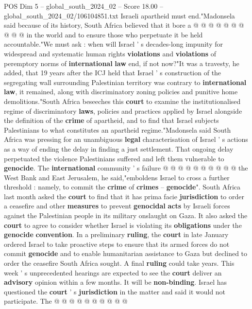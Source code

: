 \begin{textsample}{POS Dim 5 – global\_south\_2024\_02 – Score 18.00 – global\_south\_2024\_02/106104851.txt}
Israeli apartheid must end."Madonsela said because of its history, South Africa believed that it bore a @ @ @ @ @ @ @ @ @ @ in the world and to ensure those who perpetuate it be held accountable."We must ask : when will Israel ' s decades-long impunity for widespread and systematic human rights \textbf{violations} and \textbf{violations} of peremptory norms of \textbf{international} \textbf{law} end, if not now?"It was a travesty, he added, that 19 years after the ICJ held that Israel ' s construction of the segregating wall surrounding Palestinian territory was contrary to \textbf{international} \textbf{law}, it remained, along with discriminatory zoning policies and punitive home demolitions."South Africa beseeches this \textbf{court} to examine the institutionalised regime of discriminatory \textbf{laws}, policies and practices applied by Israel alongside the definition of the \textbf{crime} of apartheid, and to find that Israel subjects Palestinians to what constitutes an apartheid regime."Madonsela said South Africa was pressing for an unambiguous \textbf{legal} characterisation of Israel ' s actions as a way of ending the delay in finding a just settlement.
That ongoing delay perpetuated the violence Palestinians suffered and left them vulnerable to \textbf{genocide}.
The \textbf{international} community ' s failure @ @ @ @ @ @ @ @ @ @ the West Bank and East Jerusalem, he said,"emboldens Israel to cross a further threshold : namely, to commit the \textbf{crime} of \textbf{crimes} -- \textbf{genocide}".
South Africa last month asked the \textbf{court} to find that it has prima facie \textbf{jurisdiction} to order a ceasefire and other \textbf{measures} to prevent \textbf{genocidal} \textbf{acts} by Israeli forces against the Palestinian people in its military onslaught on Gaza.
It also asked the \textbf{court} to agree to consider whether Israel is violating its \textbf{obligations} under the \textbf{genocide} \textbf{convention}.
In a preliminary \textbf{ruling}, the \textbf{court} in late January ordered Israel to take proactive steps to ensure that its armed forces do not commit \textbf{genocide} and to enable humanitarian assistance to Gaza but declined to order the ceasefire South Africa sought.
A final \textbf{ruling} could take years.
This week ' s unprecedented hearings are expected to see the \textbf{court} deliver an \textbf{advisory} opinion within a few months.
It will be \textbf{non-binding}.
Israel has questioned the \textbf{court} ' s \textbf{jurisdiction} in the matter and said it would not participate.
The @ @ @ @ @ @ @ @ @ @

\end{textsample}
